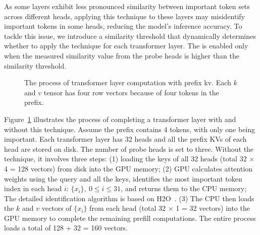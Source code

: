 As some layers exhibit less pronounced similarity between important token
sets across different heads, applying this technique to these layers may
misidentify important tokens in some heads, reducing the model's
inference accuracy. To tackle this issue, we introduce a similarity threshold
that dynamically determines whether to apply the technique
for each transformer layer.
The \techa{} is enabled only when the measured similarity value from the probe heads 
is higher than the similarity threshold.

\begin{figure}
	\centering
	\vspace{-0.1in}
	\caption{The process of transformer layer computation with prefix kv. Each \(k\) and \(v\) tensor has four row vectors because of four tokens in the prefix.}
	\label{fig:woandw-techa}
	\vspace{-0.1in}
\end{figure}




Figure~\ref{fig:woandw-techa} illustrates the process of completing a transformer layer with and without this technique. Assume the prefix contains 4 tokens, with only one being important. Each transformer layer has 32 heads and all the prefix KVs of each head are stored on disk. The number of probe heads is set to three. 
Without the \techa{} technique, it involves three steps: 
(1) loading the keys of all 32 heads (total 32 $\times$ 4 = 128 vectors) from
disk into the GPU memory; 
(2) GPU calculates attention weights using the query and all the keys,
identifies the most important token index in each head \( i \): $\{x_i\}, \ 0
\leq i \leq 31$, and returns them to the CPU memory; The detailed identification
algorithm is based on H2O~\cite{h2o-nips23}.
(3) The CPU then loads the \(k\) and \(v\) vectors of $\{x_i\}$ from each head
(total 32 $\times$ 1 = 32 vectors) into the GPU memory to complete the remaining
prefill computations. The entire process loads a total of 128 + 32 = 160
vectors.

